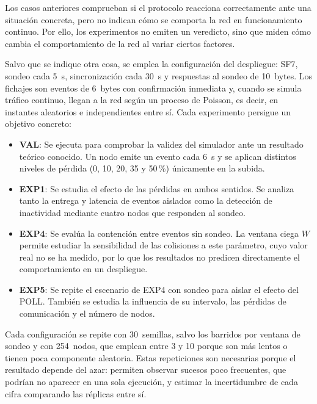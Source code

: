 Los casos anteriores comprueban si el protocolo reacciona correctamente ante una situación concreta, pero no indican cómo se comporta la red en funcionamiento continuo. Por ello, los experimentos no emiten un veredicto, sino que miden cómo cambia el comportamiento de la red al variar ciertos factores.

Salvo que se indique otra cosa, se emplea la configuración del despliegue: SF7, sondeo cada 5~s, sincronización cada 30~s y respuestas al sondeo de 10~bytes. Los fichajes son eventos de 6~bytes con confirmación inmediata y, cuando se simula tráfico continuo, llegan a la red según un proceso de Poisson, es decir, en instantes aleatorios e independientes entre sí. Cada experimento persigue un objetivo concreto:

\begin{itemize}
    \item \textbf{VAL}: Se ejecuta para comprobar la validez del simulador ante un resultado teórico conocido. Un nodo emite un evento cada 6~s y se aplican distintos niveles de pérdida (0, 10, 20, 35 y 50\,\%) únicamente en la subida.

    \item \textbf{EXP1}: Se estudia el efecto de las pérdidas en ambos sentidos. Se analiza tanto la entrega y latencia de eventos aislados como la detección de inactividad mediante cuatro nodos que responden al sondeo.

    \item \textbf{EXP4}: Se evalúa la contención entre eventos sin sondeo. La ventana ciega $W$ permite estudiar la sensibilidad de las colisiones a este parámetro, cuyo valor real no se ha medido, por lo que los resultados no predicen directamente el comportamiento en un despliegue.

    \item \textbf{EXP5}: Se repite el escenario de EXP4 con sondeo para aislar el efecto del POLL. También se estudia la influencia de su intervalo, las pérdidas de comunicación y el número de nodos.
    
\end{itemize}

Cada configuración se repite con 30~semillas, salvo los barridos por ventana de sondeo y con 254~nodos, que emplean entre 3 y 10 porque son más lentos o tienen poca componente aleatoria. Estas repeticiones son necesarias porque el resultado depende del azar: permiten observar sucesos poco frecuentes, que podrían no aparecer en una sola ejecución, y estimar la incertidumbre de cada cifra comparando las réplicas entre sí.

